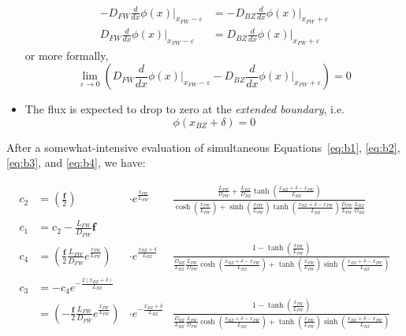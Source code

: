\documentclass[a4paper, 12pt]{article}
\newcommand{\ve}[1]{\boldsymbol{#1}}
\newcommand{\flux}[0]{\ve{f}}
\newcommand{\xFW}[0]{x_{FW}}
\newcommand{\DFW}[0]{D_{FW}}
\newcommand{\LFW}[0]{L_{FW}}
\newcommand{\DBZ}[0]{D_{BZ}}
\newcommand{\LBZ}[0]{L_{BZ}}
\newcommand{\eBZ}[0]{x_{BZ}+\delta}
\begin{document}
\begin{itemize}
\begin{align}
        -D_{FW} \frac{d}{dx}\phi(x)\Bigg|_{x_{FW}-\varepsilon} &= -D_{BZ} \frac{d}{dx}\phi(x)\Bigg|_{x_{FW}+\varepsilon}\nonumber\\
        D_{FW} \frac{d}{dx}\phi(x)\Bigg|_{x_{FW}-\varepsilon} &= D_{BZ} \frac{d}{dx}\phi(x)\Bigg|_{x_{FW}+\varepsilon}\,\label{eq:b3}
    \end{align}
    or more formally,
    \begin{equation}
        \lim_{\varepsilon\rightarrow0} \left( D_{FW} \frac{d}{dx}\phi(x)\Bigg|_{x_{FW}-\varepsilon} - D_{BZ} \frac{d}{dx}\phi(x)\Bigg|_{x_{FW}+\varepsilon} \right) = 0\nonumber
    \end{equation}
    \item The flux is expected to drop to zero at the \textit{extended boundary}, i.e.
    \begin{equation}
        \phi(x_{BZ} + \delta) = 0\label{eq:b4}
    \end{equation}
\end{itemize}

After a somewhat-intensive evaluation of simultaneous Equations~\ref{eq:b1}, \ref{eq:b2}, \ref{eq:b3}, and \ref{eq:b4}, we have:

\begin{align}
    c_2 &= \left(\frac{ \flux }{2}\right) &\cdot e^{\frac{\xFW }{\LFW } } &\frac{ \frac{\LFW }{\DFW } + \frac{\LBZ }{\DBZ }\tanh\left(\frac{\eBZ -\xFW}{\LBZ } \right)}{\cosh\left(\frac{\xFW }{\LFW }\right) + \sinh{\left(\frac{\xFW }{\LFW }\right)} \tanh\left(\frac{\eBZ -\xFW}{\LBZ } \right) \frac{\DFW }{\LFW }\frac{\LBZ }{\DBZ }}\label{eq:b1a}\\
    c_1 &= c_2 - \frac{\LFW }{\DFW }\flux \nonumber\\
    c_4 &= \left(\frac{\flux }{2}\frac{\LFW }{\DFW } e^{\frac{\xFW }{\LFW } }\right) &\cdot e^{\frac{\eBZ }{\LBZ }} &\frac{1-\tanh\left(\frac{\xFW }{\LFW }\right)}{\frac{\DBZ }{\LBZ } \frac{\LFW }{\DFW } \cosh\left(\frac{\eBZ-\xFW}{\LBZ }\right) + \tanh\left(\frac{\xFW }{\LFW }\right) \sinh\left(\frac{\eBZ - \xFW }{\LBZ }\right)} \\
    c_3 &= -c_4 e^{-\frac{2(\eBZ )}{\LBZ }}\nonumber\\
        &= \left(-\frac{\flux }{2} \frac{\LFW }{\DFW } e^{\frac{\xFW }{\LFW } }\right) &\cdot e^{-\frac{\eBZ }{\LBZ }} &\frac{1-\tanh\left(\frac{\xFW }{\LFW }\right)}{\frac{\DBZ }{\LBZ } \frac{\LFW }{\DFW } \cosh\left(\frac{\eBZ-\xFW}{\LBZ }\right) + \tanh\left(\frac{\xFW }{\LFW }\right) \sinh\left(\frac{\eBZ - \xFW }{\LBZ }\right)}\label{eq:b4a}
\end{align}
\end{document}
